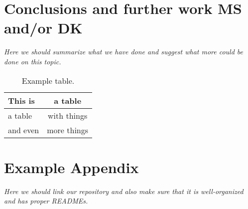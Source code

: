 \documentclass[11pt]{article}
\begin{document}
\section{Conclusions and further work \textbf{MS and/or DK}}

\textit{Here we should summarize what we have done and suggest what more could be done on this topic.}

\begin{table}
\centering
\begin{tabular}{lc}
\hline
\textbf{This is} & \textbf{a table}\\
\hline
a table & with things \\
and even & more things  \\\hline
\end{tabular}
\caption{Example table.}
\label{tab:accents}
\end{table}



\appendix

\section{Example Appendix}
\label{sec:appendix}

\textit{Here we should link our repository and also make sure that it is well-organized and has proper READMEs.}
\end{document}

